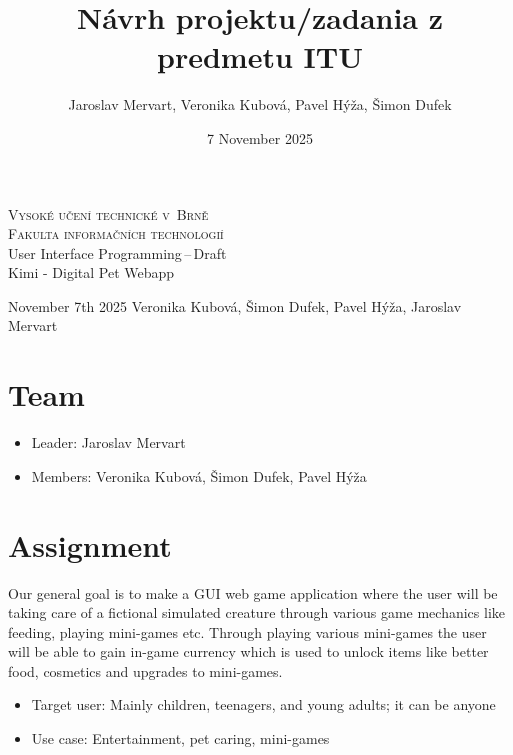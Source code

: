 \documentclass[11pt]{article}
\title{Návrh projektu/zadania z predmetu ITU}
\author{Jaroslav Mervart, Veronika Kubová, Pavel Hýža, Šimon Dufek}
\date{7 November 2025}
\begin{document}
\begin{titlepage}
\begin{center}
    \Huge
	\textsc{Vysoké učení technické v~Brně}\\
    \huge
	{\textsc{Fakulta informačních technologií }}\\
	
	\LARGE
	User Interface Programming\,--\,Draft\\
	\Huge
    Kimi - \large Digital Pet Webapp\\
	
\end{center}
{\large November 7th 2025 \hfill
Veronika Kubová, Šimon Dufek, Pavel Hýža, Jaroslav Mervart}
\end{titlepage}
\newpage

\section{Team}

\begin{itemize}
    \item Leader: Jaroslav Mervart
    \item Members: Veronika Kubová, Šimon Dufek, Pavel Hýža
\end{itemize}

\section{Assignment}
Our general goal is to make a GUI web game application where the user will be taking care of a fictional simulated creature through various game mechanics like feeding, playing mini-games etc.
Through playing various mini-games the user will be able to gain in-game currency which is used to unlock items like better food, cosmetics and upgrades to mini-games.

\begin{itemize}
    \item Target user: Mainly children, teenagers, and young adults; it can be anyone
    \item Use case: Entertainment, pet caring, mini-games
\end{itemize}
\end{document}
